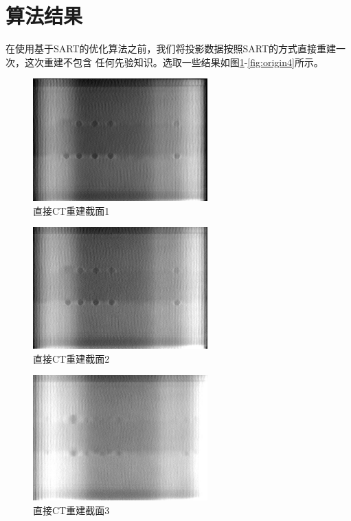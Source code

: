 \section{算法结果}
在使用基于SART的优化算法之前，我们将投影数据按照SART的方式直接重建一次，这次重建不包含
任何先验知识。选取一些结果如图\ref{fig:origin1}-\ref{fig:origin4}所示。
\begin{figure}[!ht]
\center
\includegraphics[width=0.6\textwidth]{figure/result/origin1.jpg}
\caption{直接CT重建截面1}\label{fig:origin1}
\end{figure}
\begin{figure}[!ht]
\center
\includegraphics[width=0.6\textwidth]{figure/result/origin2.jpg}
\caption{直接CT重建截面2}\label{fig:origin2}
\end{figure}
\begin{figure}[!ht]
\center
\includegraphics[width=0.6\textwidth]{figure/result/origin3.jpg}
\caption{直接CT重建截面3}\label{fig:origin3}
\end{figure}
